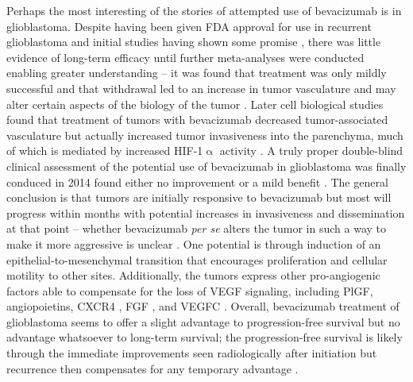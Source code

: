 Perhaps the most interesting of the stories of attempted use of bevacizumab is in glioblastoma. Despite having been given FDA approval for use in recurrent glioblastoma and initial studies having shown some promise \citep{Segerstrom2006}, there was little evidence of long-term efficacy until further meta\hyp{}analyses were conducted enabling greater understanding -- it was found that treatment was only mildly successful and that withdrawal led to an increase in tumor vasculature and may alter certain aspects of the biology of the tumor \citep{Iwamoto2009}. Later cell biological studies found that treatment of tumors with bevacizumab decreased tumor\hyp{}associated vasculature but actually increased tumor invasiveness into the parenchyma, much of which is mediated by increased HIF\hyp{}1$\upalpha$ activity \citep{Keunen2011}. A truly proper double\hyp{}blind clinical assessment of the potential use of bevacizumab in glioblastoma was finally conduced in 2014 found either no improvement \citep{Gilbert2014} or a mild benefit \citep{Chinot2014}. The general conclusion is that tumors are initially responsive to bevacizumab but most will progress within months with potential increases in invasiveness and dissemination at that point -- whether bevacizumab \textit{per se} alters the tumor in such a way to make it more aggressive is unclear \citep{Li2017}. One potential is through induction of an epithelial\hyp{}to\hyp{}mesenchymal transition that encourages proliferation and cellular motility to other sites. Additionally, the tumors express other pro\hyp{}angiogenic factors able to compensate for the loss of VEGF signaling, including PlGF, angiopoietins, CXCR4 \citep{Xu2009a}, FGF \citep{Tamura2017}, and VEGFC \citep{Michaelsen2018, Villefranc2013, Zhao2017}. Overall, bevacizumab treatment of glioblastoma seems to offer a slight advantage to progression\hyp{}free survival but no advantage whatsoever to long\hyp{}term survival; the progression\hyp{}free survival is likely through the immediate improvements seen radiologically after initiation but recurrence then compensates for any temporary advantage \citep{Wick2017, Zhan2019}. 

